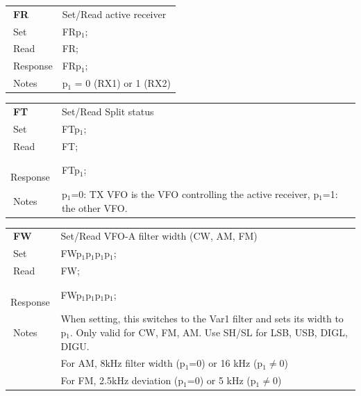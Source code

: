 \documentclass[12pt]{book}
\begin{document}
\begin{center}
\begin{tabular}{|p{2cm}|p{11cm}|}
\toprule
$\phantom{\Big|}$\textbf{\large FR} & Set/Read active receiver \\\cline{1-2}
$\phantom{\Big|}${\large Set} & {FRp$_1$;} \\\hline
$\phantom{\Big|}${\large Read} & {FR;} \\\hline
$\phantom{\Big|}${\large Response} & {FRp$_1$;} \\\hline
$\phantom{\Big|}${\large Notes} & \multicolumn{1}{|p{11cm}|}{p$_1$ = 0 (RX1) or 1 (RX2)} \\
\bottomrule
\end{tabular}
\end{center}

\begin{center}
\begin{tabular}{|p{2cm}|p{11cm}|}
\toprule
$\phantom{\Big|}$\textbf{\large FT} & Set/Read Split status \\\cline{1-2}
$\phantom{\Big|}${\large Set} & {FTp$_1$;} \\\hline
$\phantom{\Big|}${\large Read} & {FT;} \\\hline
$\phantom{\Big|}${\large Response} & {FTp$_1$;} \\\hline
$\phantom{\Big|}${\large Notes} & \multicolumn{1}{|p{11cm}|}{p$_1$=0: TX VFO is the VFO controlling the active receiver, p$_1$=1: the other VFO.} \\
\bottomrule
\end{tabular}
\end{center}

\begin{center}
\begin{tabular}{|p{2cm}|p{11cm}|}
\toprule
$\phantom{\Big|}$\textbf{\large FW} & Set/Read VFO-A filter width (CW, AM, FM) \\\cline{1-2}
$\phantom{\Big|}${\large Set} & {FWp$_1$p$_1$p$_1$p$_1$;} \\\hline
$\phantom{\Big|}${\large Read} & {FW;} \\\hline
$\phantom{\Big|}${\large Response} & {FWp$_1$p$_1$p$_1$p$_1$;} \\\hline
$\phantom{\Big|}${\large Notes} & \multicolumn{1}{|p{11cm}|}{When setting, this switches to the Var1 filter and sets its  width to p$_1$. Only valid for CW, FM, AM. Use SH/SL for LSB, USB, DIGL, DIGU.} \\
& \multicolumn{1}{|p{11cm}|}{For AM, 8kHz filter width (p$_1$=0) or  16 kHz (p$_1$$\ne$0)} \\
& \multicolumn{1}{|p{11cm}|}{For FM, 2.5kHz deviation (p$_1$=0) or 5 kHz (p$_1$$\ne$0)} \\
\bottomrule
\end{tabular}
\end{center}
\end{document}
